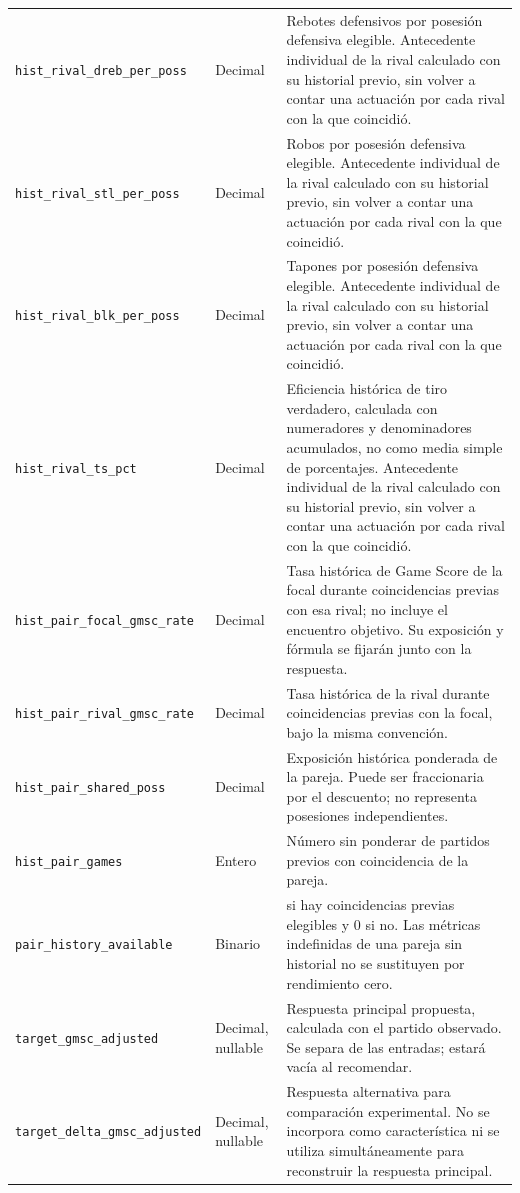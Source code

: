\begin{longtable}{@{}>{\raggedright\arraybackslash}p{5.0cm}>{\raggedright\arraybackslash}p{1.9cm}>{\raggedright\arraybackslash}p{7.7cm}@{}}
\texttt{hist\_\allowbreak rival\_\allowbreak dreb\_\allowbreak per\_\allowbreak poss} & Decimal & Rebotes defensivos por posesión defensiva elegible. Antecedente individual de la rival calculado con su historial previo, sin volver a contar una actuación por cada rival con la que coincidió.\\
\texttt{hist\_\allowbreak rival\_\allowbreak stl\_\allowbreak per\_\allowbreak poss} & Decimal & Robos por posesión defensiva elegible. Antecedente individual de la rival calculado con su historial previo, sin volver a contar una actuación por cada rival con la que coincidió.\\
\texttt{hist\_\allowbreak rival\_\allowbreak blk\_\allowbreak per\_\allowbreak poss} & Decimal & Tapones por posesión defensiva elegible. Antecedente individual de la rival calculado con su historial previo, sin volver a contar una actuación por cada rival con la que coincidió.\\
\texttt{hist\_\allowbreak rival\_\allowbreak ts\_\allowbreak pct} & Decimal & Eficiencia histórica de tiro verdadero, calculada con numeradores y denominadores acumulados, no como media simple de porcentajes. Antecedente individual de la rival calculado con su historial previo, sin volver a contar una actuación por cada rival con la que coincidió.\\
\texttt{hist\_\allowbreak pair\_\allowbreak focal\_\allowbreak gmsc\_\allowbreak rate} & Decimal & Tasa histórica de Game Score de la focal durante coincidencias previas con esa rival; no incluye el encuentro objetivo. Su exposición y fórmula se fijarán junto con la respuesta.\\
\texttt{hist\_\allowbreak pair\_\allowbreak rival\_\allowbreak gmsc\_\allowbreak rate} & Decimal & Tasa histórica de la rival durante coincidencias previas con la focal, bajo la misma convención.\\
\texttt{hist\_\allowbreak pair\_\allowbreak shared\_\allowbreak poss} & Decimal & Exposición histórica ponderada de la pareja. Puede ser fraccionaria por el descuento; no representa posesiones independientes.\\
\texttt{hist\_\allowbreak pair\_\allowbreak games} & Entero & Número sin ponderar de partidos previos con coincidencia de la pareja.\\
\texttt{pair\_\allowbreak history\_\allowbreak available} & Binario & 1 si hay coincidencias previas elegibles y 0 si no. Las métricas indefinidas de una pareja sin historial no se sustituyen por rendimiento cero.\\
\texttt{target\_\allowbreak gmsc\_\allowbreak adjusted} & Decimal, nullable & Respuesta principal propuesta, calculada con el partido observado. Se separa de las entradas; estará vacía al recomendar.\\
\texttt{target\_\allowbreak delta\_\allowbreak gmsc\_\allowbreak adjusted} & Decimal, nullable & Respuesta alternativa para comparación experimental. No se incorpora como característica ni se utiliza simultáneamente para reconstruir la respuesta principal.\\
\end{longtable}
